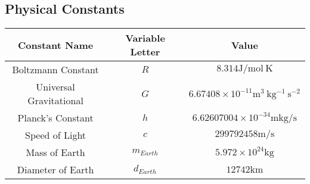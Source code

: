 \subsection{Physical Constants} \label{app:Physical Constants}
	\begin{table}[h!]
		\centering
		\begin{tabular}{|c|c|c|}
			\hline
			\textbf{Constant Name} & \textbf{Variable Letter} & \textbf{Value} \\ \hline
			Boltzmann Constant & $R$ & $8.314 \si{\joule / \mole~\kelvin}$ \\ \hline
			Universal Gravitational & $G$ & $6.67408 \times 10^{-11} \si{\meter^{3}~\kilogram^{-1}~\second^{-2}}$ \\ \hline
			Planck's Constant & $h$ & $6.62607004 \times 10^{-34} \si{\meter \kilogram / \second}$ \\ \hline
			Speed of Light & $c$ & $299792458 \si{\meter / \second}$ \\ \hline
			Mass of Earth & $m_{Earth}$ & $5.972 \times 10^{24} \si{\kilogram}$ \\ \hline
			Diameter of Earth & $d_{Earth}$ & $12742 \si{\kilo\meter}$ \\ \hline
		\end{tabular}
	\end{table}
